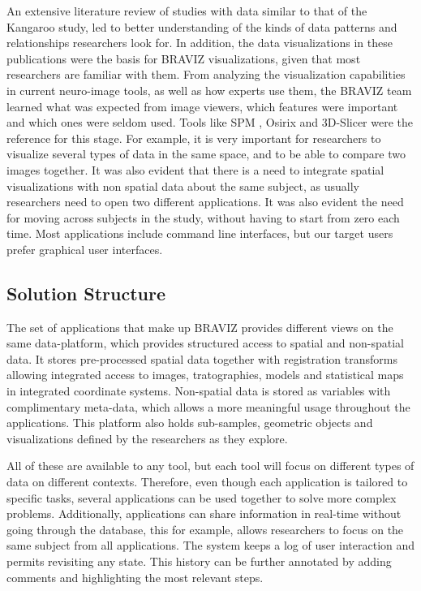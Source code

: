 \documentclass[utf8,paper]{frontiersSCNS} %
\begin{document}
An extensive literature review of studies with data similar to that of the Kangaroo study, led to better understanding of the kinds of data patterns and relationships researchers look for. In addition, the data visualizations in these publications were the basis for BRAVIZ visualizations, given that most researchers are familiar with them. From analyzing the visualization capabilities in current neuro-image tools, as well as how experts use them, the BRAVIZ team learned what was expected from image viewers, which features were important and which ones were seldom used. Tools like SPM \citep{friston_statistical_2007}, Osirix \citep{rosset_osirix:_2004} and 3D-Slicer \citep{fedorov_3d_2012} were the reference for this stage. For example, it is very important for researchers to visualize several types of data in the same space, and to be able to compare two images together. It was also evident that there is a need to integrate spatial visualizations with non spatial data about the same subject, as usually researchers need to open two different applications. It was also evident the need for moving across subjects in the study, without having to start from zero each time. Most applications include command line interfaces, but our target users prefer graphical user interfaces. 

\subsection{Solution Structure}

The set of applications that make up BRAVIZ provides different views on the same data-platform, which provides structured access to spatial and non-spatial data. It stores pre-processed spatial data together with registration transforms allowing integrated access to images, tratographies, models and statistical maps in integrated coordinate systems. Non-spatial data is stored as variables with complimentary meta-data, which allows a more meaningful usage throughout the applications. This platform also holds sub-samples, geometric objects and visualizations defined by the researchers as they explore. 

All of these are available to any tool, but each tool will focus on different types of data on different contexts. Therefore, even though each application is tailored to specific tasks, several applications can be used together to solve more complex problems. Additionally, applications can share information in real-time without going through the database, this for example, allows researchers to focus on the same subject from all applications. The system keeps a log of user interaction and permits revisiting any state. This history can be further annotated by adding comments and highlighting the most relevant steps.
\end{document}
